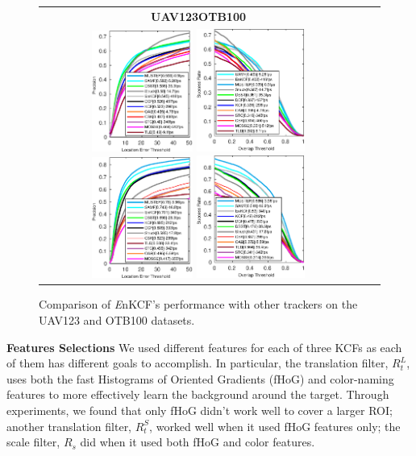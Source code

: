 \documentclass[10pt,twocolumn,letterpaper]{article}
\begin{document}
\begin{figure}[h]
\centering
\begin{tabular}{ccc}
\tiny\quad\textbf{UAV123}\hspace{.45\linewidth}\textbf{OTB100}\\
\includegraphics[width=3.30cm]{./figures/pr_uav123.eps}
\includegraphics[width=3.55cm]{./figures/sr_uav123.eps}
\includegraphics[width=3.30cm]{./figures/pr_otb100.eps}
\includegraphics[width=3.55cm]{./figures/sr_otb100.eps}\\
\end{tabular}
\caption{Comparison of {\it E}nKCF's performance with other trackers on the UAV123 and OTB100 datasets.}
\label{fig:UAV123_DATASET}
\end{figure}

\textbf{Features Selections} We used different features for each of
three KCFs as each of them has different goals to accomplish. In
particular, the translation filter, $R_{t}^{L}$, uses both the fast
Histograms of Oriented Gradients (fHoG) \cite{felzenszwalb2010object}
and color-naming \cite{van2009learning} features to more effectively
learn the background around the target. Through experiments, we found
that only fHoG didn't work well to cover a larger ROI; another
translation filter, $R_{t}^{S}$, worked well when it used fHoG
features only; the scale filter, $R_{s}$ did when it used both fHoG
and color features.
\end{document}
